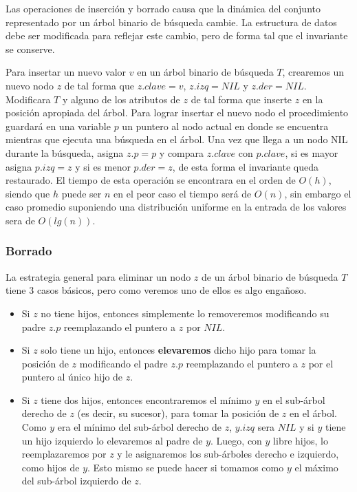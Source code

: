 \documentclass[10pt, a4paper]{report}
\begin{document}
Las operaciones de inserci\'on y borrado causa que la din\'amica del conjunto representado por un \'arbol binario de b\'usqueda cambie. La estructura de datos debe ser modificada para reflejar este cambio, pero de forma tal que el invariante se conserve.

Para insertar un nuevo valor $v$ en un \'arbol binario de b\'usqueda $T$, crearemos un nuevo nodo $z$ de tal forma que $z.clave = v$, $z.izq = NIL$ y $z.der = NIL$. Modificara $T$ y alguno de los atributos de $z$ de tal forma que inserte $z$ en la posici\'on apropiada del \'arbol. Para lograr insertar el nuevo nodo el procedimiento guardar\'a en una variable $p$ un puntero al nodo actual en donde se encuentra mientras que ejecuta una b\'usqueda en el \'arbol. Una vez que llega a un nodo NIL durante la b\'usqueda, asigna $z.p = p$ y compara $z.clave$ con $p.clave$, si es mayor asigna $p.izq = z$ y si es menor $p.der = z$, de esta forma el invariante queda restaurado. El tiempo de esta operaci\'on se encontrara en el orden de $O(h)$, siendo que $h$ puede ser $n$ en el peor caso el tiempo ser\'a de $O(n)$, sin embargo el caso promedio suponiendo una distribuci\'on uniforme en la entrada de los valores sera de $O(lg(n))$.

\subsubsection{Borrado}

La estrategia general para eliminar un nodo $z$ de un \'arbol binario de b\'usqueda $T$ tiene $3$ casos b\'asicos, pero como veremos uno de ellos es algo enga\~noso.

\begin{itemize}
 \item Si $z$ no tiene hijos, entonces simplemente lo removeremos modificando su padre $z.p$ reemplazando el puntero a $z$ por $NIL$.
 \item Si $z$ solo tiene un hijo, entonces \textbf{elevaremos} dicho hijo para tomar la posici\'on de $z$ modificando el padre $z.p$ reemplazando el puntero a $z$ por el puntero al \'unico hijo de $z$.
 \item Si $z$ tiene dos hijos, entonces encontraremos el m\'inimo $y$ en el sub-\'arbol derecho de $z$ (es decir, su sucesor), para tomar la posici\'on de $z$ en el \'arbol. Como $y$ era el m\'inimo del sub-\'arbol derecho de $z$, $y.izq$ sera $NIL$ y si $y$ tiene un hijo izquierdo lo elevaremos al padre de $y$. Luego, con $y$ libre hijos, lo reemplazaremos por $z$ y le asignaremos los sub-\'arboles derecho e izquierdo, como hijos de $y$. Esto mismo se puede hacer si tomamos como $y$ el m\'aximo del sub-\'arbol izquierdo de $z$.
\end{itemize}
\end{document}
